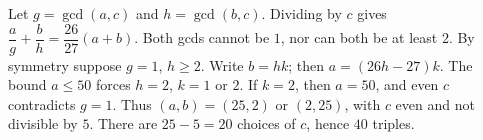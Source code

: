 Let $g=\gcd(a,c)$ and $h=\gcd(b,c)$. Dividing by $c$ gives $\dfrac{a}{g}+\dfrac{b}{h}=\dfrac{26}{27}(a+b)$. Both gcds cannot be $1$, nor can both be at least $2$. By symmetry suppose $g=1$, $h\ge2$. Write $b=hk$; then $a=(26h-27)k$. The bound $a\le50$ forces $h=2$, $k=1$ or $2$. If $k=2$, then $a=50$, and even $c$ contradicts $g=1$. Thus $(a,b)=(25,2)$ or $(2,25)$, with $c$ even and not divisible by $5$. There are $25-5=20$ choices of $c$, hence $\boxed{40}$ triples.
